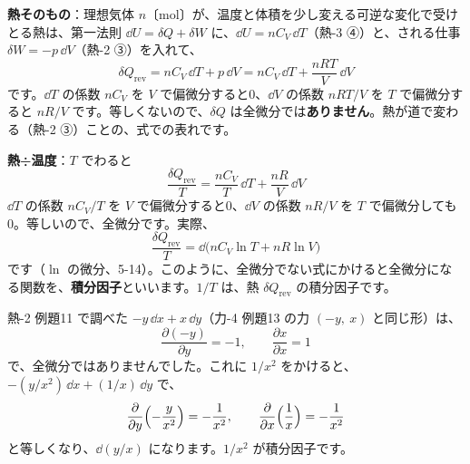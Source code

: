 \noindent\textbf{熱そのもの}：理想気体 $n$〔mol〕が、温度と体積を少し変える可逆な変化で受けとる熱は、第一法則 $\dd U=\delta Q+\delta W$ に、$\dd U=nC_V\,\dd T$（熱-3 ④）と、される仕事 $\delta W=-p\,\dd V$（熱-2 ③）を入れて、
\[\delta Q_{\mathrm{rev}}=nC_V\,\dd T+p\,\dd V=nC_V\,\dd T+\frac{nRT}{V}\,\dd V\]
です。$\dd T$ の係数 $nC_V$ を $V$ で偏微分すると0、$\dd V$ の係数 $nRT/V$ を $T$ で偏微分すると $nR/V$ です。等しくないので、$\delta Q$ は全微分では\textbf{ありません}。熱が道で変わる（熱-2 ③）ことの、式での表れです。

\noindent\textbf{熱÷温度}：$T$ でわると
\[\frac{\delta Q_{\mathrm{rev}}}{T}=\frac{nC_V}{T}\,\dd T+\frac{nR}{V}\,\dd V\]
$\dd T$ の係数 $nC_V/T$ を $V$ で偏微分すると0、$\dd V$ の係数 $nR/V$ を $T$ で偏微分しても0。等しいので、全微分です。実際、
\[\frac{\delta Q_{\mathrm{rev}}}{T}=\dd\bigl(nC_V\ln T+nR\ln V\bigr)\]
です（$\ln$ の微分、5-14）。このように、全微分でない式にかけると全微分になる関数を、\textbf{積分因子}といいます。$1/T$ は、熱 $\delta Q_{\mathrm{rev}}$ の積分因子です。

\begin{phmijika}[数学の式で見る積分因子]
熱-2 例題11 で調べた $-y\,\dd x+x\,\dd y$（力-4 例題13 の力 $(-y,\ x)$ と同じ形）は、
\[\frac{\partial(-y)}{\partial y}=-1,\qquad\frac{\partial x}{\partial x}=1\]
で、全微分ではありませんでした。これに $1/x^2$ をかけると、$-(y/x^2)\,\dd x+(1/x)\,\dd y$ で、
\[\frac{\partial}{\partial y}\Bigl(-\frac{y}{x^2}\Bigr)=-\frac{1}{x^2},\qquad\frac{\partial}{\partial x}\Bigl(\frac{1}{x}\Bigr)=-\frac{1}{x^2}\]
と等しくなり、$\dd(y/x)$ になります。$1/x^2$ が積分因子です。
\end{phmijika}

